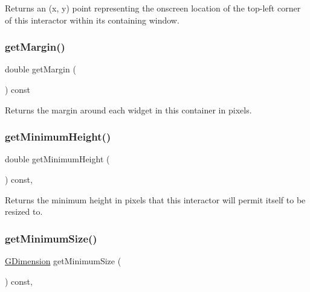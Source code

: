Returns an (x, y) point representing the onscreen location of the top-\/left corner of this interactor within its containing window. 

\mbox{\label{classGContainer_ae2b63e249b9251e1893dae87aaf4cc3d}} 
\subsubsection{\texorpdfstring{get\+Margin()}{getMargin()}}
{\footnotesize\ttfamily double get\+Margin (\begin{DoxyParamCaption}{ }\end{DoxyParamCaption}) const\hspace{0.3cm}{\ttfamily [virtual]}}



Returns the margin around each widget in this container in pixels. 

\mbox{\label{classGInteractor_aed4b0075fcc434499c3cb3e46896bda3}} 
\subsubsection{\texorpdfstring{get\+Minimum\+Height()}{getMinimumHeight()}}
{\footnotesize\ttfamily double get\+Minimum\+Height (\begin{DoxyParamCaption}{ }\end{DoxyParamCaption}) const\hspace{0.3cm}{\ttfamily [virtual]}, {\ttfamily [inherited]}}



Returns the minimum height in pixels that this interactor will permit itself to be resized to. 

\mbox{\label{classGInteractor_a66b5af0b32493b4d597ca0a3df2049ea}} 
\subsubsection{\texorpdfstring{get\+Minimum\+Size()}{getMinimumSize()}}
{\footnotesize\ttfamily \mbox{\hyperlink{classGDimension}{G\+Dimension}} get\+Minimum\+Size (\begin{DoxyParamCaption}{ }\end{DoxyParamCaption}) const\hspace{0.3cm}{\ttfamily [virtual]}, {\ttfamily [inherited]}}




